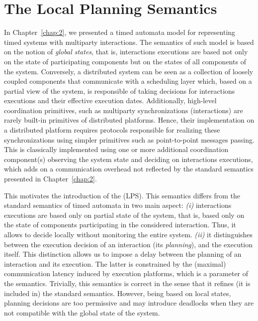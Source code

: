 \chapter{The Local Planning Semantics}\label{chap:5}
\minitoc
\label{sec3}

In Chapter~\ref{chap:2}, we presented a timed automata model for representing timed systems
with multiparty interactions. The semantics of such model is based on the notion of \emph{global
states}, that is, interactions executions are based not only on the state of participating
components but on the states of all components of the system.
Conversely, a distributed system can be seen as a collection of loosely coupled
components that communicate with a scheduling layer which, based on
a partial view of the system, is responsible of taking decisions for interactions executions
and their effective execution dates. 
Additionally, high-level coordination primitives, such as multiparty synchronizations 
(interactions) are rarely built-in primitives of distributed platforms. 
Hence, their implementation on a distributed platform requires 
protocols responsible for realizing these synchronizations using simpler primitives such as 
point-to-point messages passing.
This is classically implemented using one or more additional 
coordination component(s) observing the system state and deciding on interactions executions,
which adds on a communication overhead not reflected by the standard semantics presented in
Chapter~\ref{chap:2}.

This motivates the introduction of the \emph{\lpsb} (LPS). This semantics differs from
the standard semantics of timed automata in two main aspect: \emph{(i)} interactions executions
are based only on partial state of the system, that is, based only on the state of components
participating in the considered interaction. Thus, it allows to decide locally without 
monitoring the entire system. \emph{(ii)} it distinguishes between the 
execution decision of an interaction (its \emph{planning}), and the execution itself.
This distinction allows us to impose a delay between the planning of an interaction and 
its execution. The latter is constrained by the (maximal) communication latency induced 
by execution platforms, which is a parameter of the semantics.
Trivially, this semantics is correct in the sense that it refines (it is included in) the standard semantics.
However, being based on local states, planning decisions are too permissive and may 
introduce deadlocks when they are not compatible with the global state of the system.

